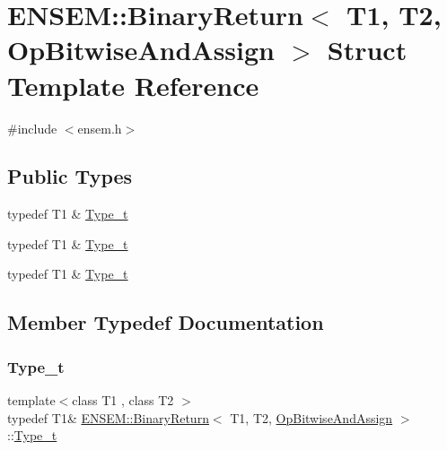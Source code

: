 \hypertarget{structENSEM_1_1BinaryReturn_3_01T1_00_01T2_00_01OpBitwiseAndAssign_01_4}{}\section{E\+N\+S\+EM\+:\+:Binary\+Return$<$ T1, T2, Op\+Bitwise\+And\+Assign $>$ Struct Template Reference}
\label{structENSEM_1_1BinaryReturn_3_01T1_00_01T2_00_01OpBitwiseAndAssign_01_4}


{\ttfamily \#include $<$ensem.\+h$>$}

\subsection*{Public Types}
\begin{DoxyCompactItemize}
\item 
typedef T1 \& \mbox{\hyperlink{structENSEM_1_1BinaryReturn_3_01T1_00_01T2_00_01OpBitwiseAndAssign_01_4_a89c578dd7fb24880911d984649901627}{Type\+\_\+t}}
\item 
typedef T1 \& \mbox{\hyperlink{structENSEM_1_1BinaryReturn_3_01T1_00_01T2_00_01OpBitwiseAndAssign_01_4_a89c578dd7fb24880911d984649901627}{Type\+\_\+t}}
\item 
typedef T1 \& \mbox{\hyperlink{structENSEM_1_1BinaryReturn_3_01T1_00_01T2_00_01OpBitwiseAndAssign_01_4_a89c578dd7fb24880911d984649901627}{Type\+\_\+t}}
\end{DoxyCompactItemize}


\subsection{Member Typedef Documentation}
\mbox{\label{structENSEM_1_1BinaryReturn_3_01T1_00_01T2_00_01OpBitwiseAndAssign_01_4_a89c578dd7fb24880911d984649901627}} 
\subsubsection{\texorpdfstring{Type\_t}{Type\_t}\hspace{0.1cm}{\footnotesize\ttfamily [1/3]}}
{\footnotesize\ttfamily template$<$class T1 , class T2 $>$ \\
typedef T1\& \mbox{\hyperlink{structENSEM_1_1BinaryReturn}{E\+N\+S\+E\+M\+::\+Binary\+Return}}$<$ T1, T2, \mbox{\hyperlink{structENSEM_1_1OpBitwiseAndAssign}{Op\+Bitwise\+And\+Assign}} $>$\+::\mbox{\hyperlink{structENSEM_1_1BinaryReturn_3_01T1_00_01T2_00_01OpBitwiseAndAssign_01_4_a89c578dd7fb24880911d984649901627}{Type\+\_\+t}}}

